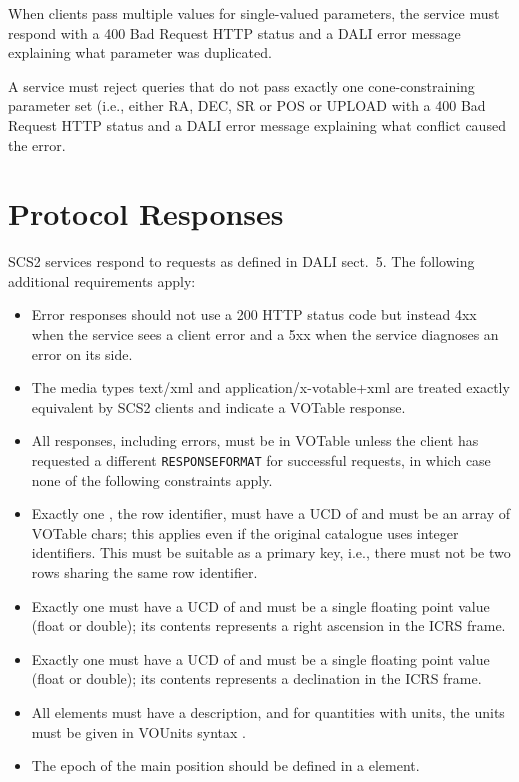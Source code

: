 \documentclass[11pt,a4paper]{ivoa}
\begin{document}
When clients pass multiple values for single-valued parameters, the
service must respond with a 400 Bad Request HTTP status and a DALI error
message explaining what parameter was duplicated.

A service must reject queries that do not pass exactly one
cone-constraining parameter set (i.e., either RA, DEC, SR or POS or
UPLOAD with a 400 Bad Request HTTP status and a DALI error
message explaining what conflict caused the error.


\section{Protocol Responses}

SCS2 services respond to requests as defined in DALI sect.~5.  The
following additional requirements apply:

\begin{itemize}
\item Error responses should not use a 200 HTTP status code but instead
4xx when the service sees a client error and a 5xx when the service
diagnoses an error on its side.

\item The media types text/xml and application/x-votable+xml are treated
exactly equivalent by SCS2 clients and indicate a VOTable response.

\item All responses, including errors, must be in VOTable unless the
client has requested a different \verb|RESPONSEFORMAT| for successful
requests, in which case none of
the following constraints apply.

\item Exactly one , the row identifier, must have a UCD of
 and must be an array of VOTable chars; this
applies even if the original catalogue uses integer identifiers.  This
must be suitable as a primary key, i.e., there must not be two rows
sharing the same row identifier.

\item Exactly one  must have a UCD of
 and must be a single floating point value
(float or double); its contents represents a right ascension in the ICRS
frame.

\item Exactly one  must have a UCD of
 and must be a single floating point value
(float or double); its contents represents a declination in the ICRS
frame.

\item All  elements must have a description, and for
quantities with units, the units must be given in VOUnits syntax
\citep{2014ivoa.spec.0523D}.

\item The epoch of the main position should be defined in a
 element.
\end{itemize}
\end{document}
